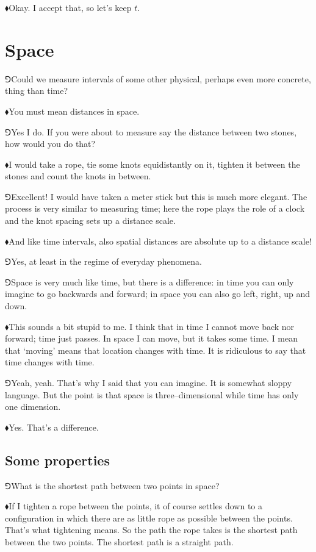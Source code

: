 \documentclass[11pt,oneside%
]{memoir}
\newcommand{\hea}{\(\blacklozenge\)\;}
\newcommand{\heb}{\(\Game\)\;}
\begin{document}
\hea Okay. I accept that, so let's keep \(t\).
\section{Space}
\heb Could we measure intervals of some other physical, perhaps even more concrete, thing than time?

\hea You must mean distances in space.

\heb Yes I do. If you were about to measure say the distance between two stones, how would you do that?

\hea I would take a rope, tie some knots equidistantly on it, tighten it between the stones and count the knots in between.

\heb Excellent! I would have taken a meter stick but this is much more elegant. The process is very similar to measuring time; here the rope plays the role of a clock and the knot spacing sets up a distance scale.

\hea And like time intervals, also spatial distances are absolute up to a distance scale!

\heb Yes, at least in the regime of everyday phenomena.

\heb Space is very much like time, but there is a difference: in time you can only imagine to go backwards and forward; in space you can also go left, right, up and down.

\hea This sounds a bit stupid to me. I think that in time I cannot move back nor forward; time just passes. In space I can move, but it takes some time. I mean that `moving' means that location changes with time. It is ridiculous to say that time changes with time.

\heb Yeah, yeah. That's why I said that you can imagine. It is somewhat sloppy language. But the point is that space is three--dimensional while time has only one dimension.

\hea Yes. That's a difference.
\subsection{Some properties}
\heb What is the shortest path between two points in space?

\hea If I tighten a rope between the points, it of course settles down to a configuration in which there are as little rope as possible between the points. That's what tightening means. So the path the rope takes is the shortest path between the two points. The shortest path is a straight path.
\end{document}

